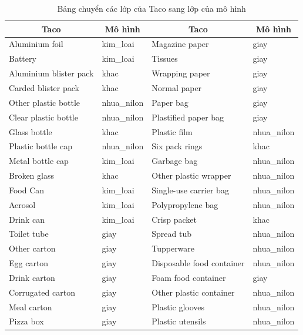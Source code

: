 \documentclass[../the.tex]{subfiles}
\begin{document}
\begin{table}[!ht]
    \centering
    \caption{Bảng chuyển các lớp của Taco sang lớp của mô hình}
    \begin{tabular}{|l|l|l|l|}
		\hline 
		 \multicolumn{1}{|c|}{\textbf{Taco}}
		 & \multicolumn{1}{c|}{\textbf{Mô hình}}
		 & \multicolumn{1}{c|}{\textbf{Taco}}
		 & \multicolumn{1}{c|}{\textbf{Mô hình}}  \\
		\hline
        Aluminium foil & kim\_loai & Magazine paper & giay \\ \hline
        Battery & kim\_loai & Tissues & giay \\ \hline
        Aluminium blister pack & khac & Wrapping paper & giay \\ \hline
        Carded blister pack & khac & Normal paper & giay \\ \hline
        Other plastic bottle & nhua\_nilon & Paper bag & giay \\ \hline
        Clear plastic bottle & nhua\_nilon & Plastified paper bag & giay \\ \hline
        Glass bottle & khac & Plastic film & nhua\_nilon \\ \hline
        Plastic bottle cap & nhua\_nilon & Six pack rings & khac \\ \hline
        Metal bottle cap & kim\_loai & Garbage bag & nhua\_nilon \\ \hline
        Broken glass & khac & Other plastic wrapper & nhua\_nilon \\ \hline
        Food Can & kim\_loai & Single-use carrier bag & nhua\_nilon \\ \hline
        Aerosol & kim\_loai & Polypropylene bag & nhua\_nilon \\ \hline
        Drink can & kim\_loai & Crisp packet & khac \\ \hline
        Toilet tube & giay & Spread tub & nhua\_nilon \\ \hline
        Other carton & giay & Tupperware & nhua\_nilon \\ \hline
        Egg carton & giay & Disposable food container & nhua\_nilon \\ \hline
        Drink carton & giay & Foam food container & giay \\ \hline
        Corrugated carton & giay & Other plastic container & nhua\_nilon \\ \hline
        Meal carton & giay & Plastic glooves & nhua\_nilon \\ \hline
        Pizza box & giay & Plastic utensils & nhua\_nilon \\ \hline

\end{tabular}
\end{table}
\end{document}

